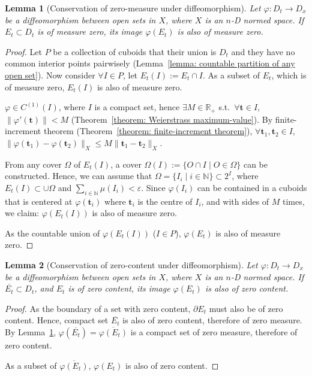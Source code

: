 \documentclass[openany]{book}
\theoremstyle{plain}
\newtheorem{lemma}{Lemma} %
\theoremstyle{definition}
\newcommand*{\bv}{\boldsymbol} %
\begin{document}
\begin{lemma}[Conservation of zero-measure under diffeomorphism]
	\label{lemma: conservation of zero-measure under diffeomorphism}
	Let $\varphi \colon D_t \to D_x$ be a diffeomorphism between open sets in $X$, where $X$ is an $n$-D normed space.
	If $E_t \subset D_t$ is of measure zero, its image $\varphi(E_t)$ is also of measure zero.
\end{lemma}
\begin{proof}
	Let $P$ be a collection of cuboids that their union is $D_t$ and they have no common interior points pairwisely (Lemma~\ref{lemma: countable partition of any open set}). 
	Now consider $\forall I \in P$, let $E_t(I) := E_t \cap I$. 
	As a subset of $E_t$, which is of measure zero, $E_t(I)$ is also of measure zero.

	$\varphi \in C^{(1)}(I)$, where $I$ is a compact set, hence $\exists M \in \mathbb R_+$ s.t.\ $\forall \bv t \in I$, $\|\varphi'(\bv t)\| < M$ (Theorem~\ref{theorem: Weierstrass maximum-value}). 
	By finite-increment theorem (Theorem~\ref{theorem: finite-increment theorem}), $\forall \bv t_1, \bv t_2 \in I$, $\|\varphi(\bv t_1) - \varphi(\bv t_2)\|_X \leq M\|\bv t_1 - \bv t_2\|_X$.

	From any cover $\varOmega$ of $E_t(I)$, a cover $\varOmega(I) := \{O \cap I \mid O \in \varOmega \}$ can be constructed. 
	Hence, we can assume that $\varOmega = \{I_i \mid i \in \mathbb N\} \subset 2^I$, where $E_t(I) \subset \cup \varOmega$ and $\sum_{i \in \mathbb N} \mu(I_i) < \varepsilon$. 
	Since $\varphi(I_i)$ can be contained in a cuboids that is centered at $\varphi(\bv t_i)$ where $\bv t_i$ is the centre of $I_i$, and with sides of $M$ times, we claim: $\varphi(E_t(I))$ is also of measure zero.
	
	As the countable union of $\varphi(E_t(I))$ ($I \in P$), $\varphi(E_t)$ is also of measure zero.
\end{proof}

\begin{lemma}[Conservation of zero-content under diffeomorphism]
	\label{lemma: conservation of zero-content under diffeomorphism}
	Let $\varphi \colon D_t \to D_x$ be a diffeomorphism between open sets in $X$, where $X$ is an $n$-D normed space.
	If $\overline{E_t} \subset D_t$, and $E_t$ is of zero content, its image $\varphi(E_t)$ is also of zero content.
\end{lemma}
\begin{proof}
	As the boundary of a set with zero content, $\partial E_t$ must also be of zero content. 
	Hence, compact set $\overline{E_t}$ is also of zero content, therefore of zero measure.  
	By Lemma~\ref{lemma: conservation of zero-measure under diffeomorphism}, $\varphi(\overline{E_t}) = \overline{\varphi(E_t)}$ is a compact set of zero measure, therefore of zero content.

	As a subset of $\overline{\varphi(E_t)}$, $\varphi(E_t)$ is also of zero content.
\end{proof}
\end{document}
